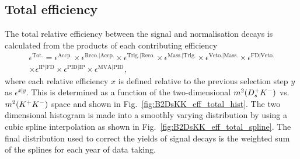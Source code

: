 \subsection{Total efficiency}
The total relative efficiency between the signal and normalisation decays is calculated from the products of each contributing efficiency
\begin{multline}
\epsilon^\text{Tot.} = \epsilon^{\text{Accp.}} \times \epsilon^{\text{Reco.}|\text{Accp.}} \times \epsilon^{\text{Trig.}|\text{Reco.}}\times \epsilon^{\text{Mass.}|\text{Trig.}}\times \epsilon^{\text{Veto.}|\text{Mass.}}\times \epsilon^{\text{FD}|\text{Veto.}}\\
\times \epsilon^{\text{IP}|\text{FD}} \times \epsilon^{\text{PID}|\text{IP}} \times \epsilon^{\text{MVA}|\text{PID}},
\label{eq:B2DsPhi_eff_eq}
\end{multline}
where each relative efficiency $x$ is defined relative to the previous selection step $y$ as $\epsilon^{x|y}$. This is determined as a function of the two-dimensional $m^{2}({{D}^+_{s}}{{K}^-})$ vs. $m^{2}({{K}^+}{{K}^-})$ space and shown in Fig.~\ref{fig:B2DsKK_eff_total_hist}. 
The two dimensional histogram is made into a smoothly varying distribution by using a cubic spline interpolation as shown in Fig.~\ref{fig:B2DsKK_eff_total_spline}. The final distribution used to correct the yields of signal decays is the weighted sum of the splines for each year of data taking.


